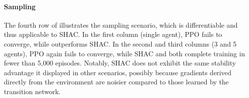 \paragraph{Sampling}
The fourth row of  illustrates the sampling scenario, which is differentiable and thus applicable to SHAC. In the first column (single agent), PPO fails to converge, while \fname{} outperforms SHAC. In the second and third columns (3 and 5 agents), PPO again fails to converge, while SHAC and \fname{} both complete training in fewer than 5,000 episodes. Notably, SHAC does not exhibit the same stability advantage it displayed in other scenarios, possibly because gradients derived directly from the environment are noisier compared to those learned by the transition network.
